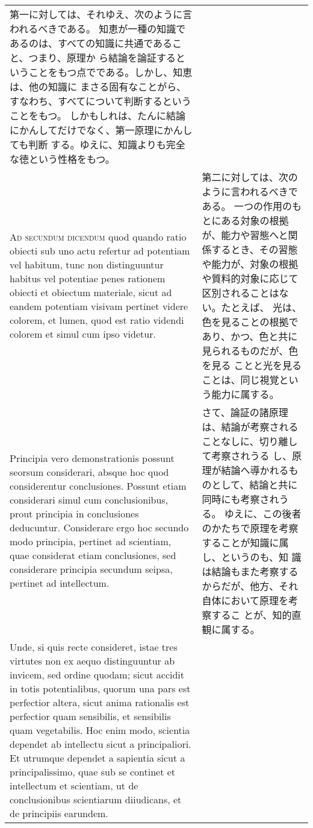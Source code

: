 \documentclass[10pt]{jsarticle} %
\begin{document}
\begin{longtable}{p{21em}p{21em}}
第一に対しては、それゆえ、次のように言われるべきである。
知恵が一種の知識であるのは、すべての知識に共通であること、つまり、原理か
 ら結論を論証するということをもつ点でである。しかし、知恵は、他の知識に
 まさる固有なことがら、すなわち、すべてについて判断するということをもつ。
 しかもしれは、たんに結論にかんしてだけでなく、第一原理にかんしても判断
 する。ゆえに、知識よりも完全な徳という性格をもつ。


\\



{\scshape Ad secundum dicendum} quod quando ratio
 obiecti sub uno actu refertur ad potentiam vel habitum, tunc non
 distinguuntur habitus vel potentiae penes rationem obiecti et obiectum
 materiale, sicut ad eandem potentiam visivam pertinet videre colorem,
 et lumen, quod est ratio videndi colorem et simul cum ipso
 videtur. 


&
第二に対しては、次のように言われるべきである。
一つの作用のもとにある対象の根拠が、能力や習態へと関係するとき、その習態
 や能力が、対象の根拠や質料的対象に応じて区別されることはない。たとえば、
光は、色を見ることの根拠であり、かつ、色と共に見られるものだが、色を見る
 ことと光を見ることは、同じ視覚という能力に属する。



\\


Principia vero demonstrationis possunt seorsum considerari,
 absque hoc quod considerentur conclusiones. Possunt etiam considerari
 simul cum conclusionibus, prout principia in conclusiones
 deducuntur. Considerare ergo hoc secundo modo principia, pertinet ad
 scientiam, quae considerat etiam conclusiones, sed considerare
 principia secundum seipsa, pertinet ad intellectum. 


&

さて、論証の諸原理は、結論が考察されることなしに、切り離して考察されうる
 し、原理が結論へ導かれるものとして、結論と共に同時にも考察されうる。
ゆえに、この後者のかたちで原理を考察することが知識に属し、というのも、知
 識は結論もまた考察するからだが、他方、それ自体において原理を考察するこ
 とが、知的直観に属する。


\\

Unde, si quis recte
 consideret, istae tres virtutes non ex aequo distinguuntur ab invicem,
 sed ordine quodam; sicut accidit in totis potentialibus, quorum una
 pars est perfectior altera, sicut anima rationalis est perfectior quam
 sensibilis, et sensibilis quam vegetabilis. Hoc enim modo, scientia
 dependet ab intellectu sicut a principaliori. Et utrumque dependet a
 sapientia sicut a principalissimo, quae sub se continet et intellectum
 et scientiam, ut de conclusionibus scientiarum diiudicans, et de
 principiis earundem.


\end{longtable}
\end{document}

